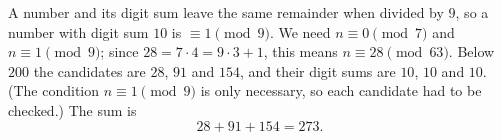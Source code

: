 A number and its digit sum leave the same remainder when divided by $9$, so a number with digit sum $10$ is $\equiv1\pmod 9$. We need $n\equiv0\pmod7$ and $n\equiv1\pmod9$; since $28=7\cdot4=9\cdot3+1$, this means $n\equiv28\pmod{63}$. Below $200$ the candidates are $28$, $91$ and $154$, and their digit sums are $10$, $10$ and $10$. (The condition $n\equiv1\pmod9$ is only necessary, so each candidate had to be checked.) The sum is
\[28+91+154=\boxed{273}.\]
